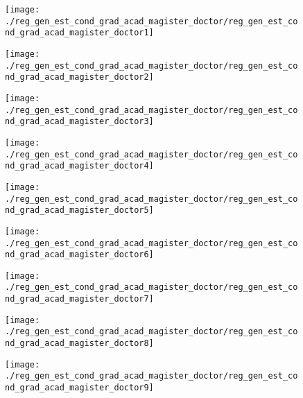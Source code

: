 \begin{figure}[!ht]
    \centering
    \texttt{[image: ./reg\_gen\_est\_cond\_grad\_acad\_magister\_doctor/reg\_gen\_est\_cond\_grad\_acad\_magister\_doctor1]}
\end{figure}
\clearpage

\begin{figure}[!ht]
    \centering
    \texttt{[image: ./reg\_gen\_est\_cond\_grad\_acad\_magister\_doctor/reg\_gen\_est\_cond\_grad\_acad\_magister\_doctor2]}
\end{figure}
\clearpage

\begin{figure}[!ht]
    \centering
    \texttt{[image: ./reg\_gen\_est\_cond\_grad\_acad\_magister\_doctor/reg\_gen\_est\_cond\_grad\_acad\_magister\_doctor3]}
\end{figure}
\clearpage

\begin{figure}[!ht]
    \centering
    \texttt{[image: ./reg\_gen\_est\_cond\_grad\_acad\_magister\_doctor/reg\_gen\_est\_cond\_grad\_acad\_magister\_doctor4]}
\end{figure}
\clearpage

\begin{figure}[!ht]
    \centering
    \texttt{[image: ./reg\_gen\_est\_cond\_grad\_acad\_magister\_doctor/reg\_gen\_est\_cond\_grad\_acad\_magister\_doctor5]}
\end{figure}
\clearpage

\begin{figure}[!ht]
    \centering
    \texttt{[image: ./reg\_gen\_est\_cond\_grad\_acad\_magister\_doctor/reg\_gen\_est\_cond\_grad\_acad\_magister\_doctor6]}
\end{figure}
\clearpage

\begin{figure}[!ht]
    \centering
    \texttt{[image: ./reg\_gen\_est\_cond\_grad\_acad\_magister\_doctor/reg\_gen\_est\_cond\_grad\_acad\_magister\_doctor7]}
\end{figure}
\clearpage

\begin{figure}[!ht]
    \centering
    \texttt{[image: ./reg\_gen\_est\_cond\_grad\_acad\_magister\_doctor/reg\_gen\_est\_cond\_grad\_acad\_magister\_doctor8]}
\end{figure}
\clearpage

\begin{figure}[!ht]
    \centering
    \texttt{[image: ./reg\_gen\_est\_cond\_grad\_acad\_magister\_doctor/reg\_gen\_est\_cond\_grad\_acad\_magister\_doctor9]}
\end{figure}
\clearpage

